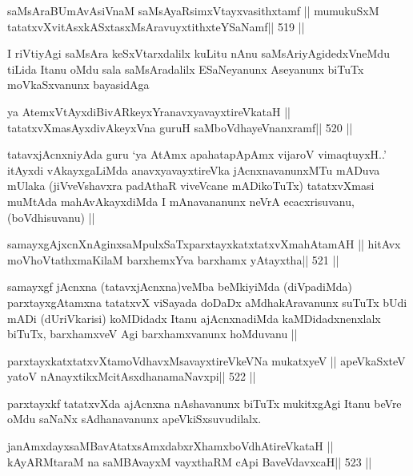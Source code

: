 \begin{shl}
saMsAraBUmAvAsiVnaM saMsAyaRsimxVtayxvasithxtamf ||
mumukuSxM tatatxvXvitAsxkASxtasxMsAravuyxtithxteYSaNamf\hfill || 519 ||
\end{shl}

\begin{artha}
I riVtiyAgi saMsAra keSxVtarxdalilx kuLitu nAnu saMsAriyAgidedxVneMdu
tiLida Itanu oMdu sala saMsAradalilx ESaNeyanunx Aseyanunx biTuTx
moVkaSxvanunx bayasidAga 
\end{artha}

\begin{shl}
ya AtemxVtAyxdiBivARkeyxYranavxyavayxtireVkataH ||
tatatxvXmasAyxdivAkeyxVna guruH saMboVdhayeVnanxramf\hfill || 520 ||
\end{shl}

\begin{artha}
tatavxjAcnxniyAda guru `ya AtAmx apahatapApAmx vijaroV
vimaqtuyxH..' itAyxdi vAkayxgaLiMda anavxyavayxtireVka jAcnxnavanunxMTu
mADuva mUlaka (jiVveVshavxra padAthaR viveVcane mADikoTuTx) tatatxvXmasi
muMtAda mahAvAkayxdiMda I mAnavananunx neVrA ecacxrisuvanu,
(boVdhisuvanu) ||
\end{artha}

\begin{shl}
samayxgAjxcnXnAginxsaMpulxSaTxparxtayxkatxtatxvXmahAtamAH ||
hitAvx moVhoVtathxmaKilaM barxhemxYva barxhamx yAtayxtha\hfill || 521 ||
\end{shl}

\begin{artha}
samayxgf jAcnxna (tatavxjAcnxna)veMba beMkiyiMda (diVpadiMda)
parxtayxgAtamxna tatatxvX viSayada doDaDx aMdhakAravanunx suTuTx bUdi
mADi (dUriVkarisi) koMDidadx Itanu ajAcnxnadiMda kaMDidadxnenxlalx
biTuTx, barxhamxveV Agi barxhamxvanunx hoMduvanu || 
\end{artha}

\begin{shl}
parxtayxkatxtatxvXtamoVdhavxMsavayxtireVkeVNa mukatxyeV ||
apeVkaSxteV yatoV nAnayxtikxMcitAsxdhanamaNavxpi\hfill || 522 ||
\end{shl}

\begin{artha}
parxtayxkf tatatxvXda ajAcnxna nAshavanunx biTuTx mukitxgAgi Itanu beVre
oMdu saNaNx sAdhanavanunx apeVkiSxsuvudilalx.
\end{artha}

\begin{shl}
janAmxdayxsaMBavAtatxsAmxdabxrXhamxboVdhAtireVkataH ||
kAyARMtaraM na saMBAvayxM vayxthaRM cApi BaveVdavxcaH\hfill || 523 ||
\end{shl}

